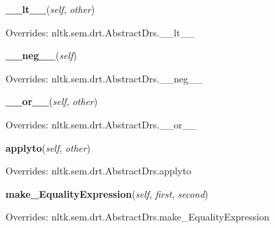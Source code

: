 \hspace{.8\funcindent}\begin{boxedminipage}{\funcwidth}

    \raggedright \textbf{\_\_lt\_\_}(\textit{self}, \textit{other})

\setlength{\parskip}{2ex}
\setlength{\parskip}{1ex}
      Overrides: nltk.sem.drt.AbstractDrs.\_\_lt\_\_

    \end{boxedminipage}

    \vspace{0.5ex}

\hspace{.8\funcindent}\begin{boxedminipage}{\funcwidth}

    \raggedright \textbf{\_\_neg\_\_}(\textit{self})

\setlength{\parskip}{2ex}
\setlength{\parskip}{1ex}
      Overrides: nltk.sem.drt.AbstractDrs.\_\_neg\_\_

    \end{boxedminipage}

    \vspace{0.5ex}

\hspace{.8\funcindent}\begin{boxedminipage}{\funcwidth}

    \raggedright \textbf{\_\_or\_\_}(\textit{self}, \textit{other})

\setlength{\parskip}{2ex}
\setlength{\parskip}{1ex}
      Overrides: nltk.sem.drt.AbstractDrs.\_\_or\_\_

    \end{boxedminipage}

    \vspace{0.5ex}

\hspace{.8\funcindent}\begin{boxedminipage}{\funcwidth}

    \raggedright \textbf{applyto}(\textit{self}, \textit{other})

\setlength{\parskip}{2ex}
\setlength{\parskip}{1ex}
      Overrides: nltk.sem.drt.AbstractDrs.applyto

    \end{boxedminipage}

    \vspace{0.5ex}

\hspace{.8\funcindent}\begin{boxedminipage}{\funcwidth}

    \raggedright \textbf{make\_EqualityExpression}(\textit{self}, \textit{first}, \textit{second})

\setlength{\parskip}{2ex}
\setlength{\parskip}{1ex}
      Overrides: nltk.sem.drt.AbstractDrs.make\_EqualityExpression

    \end{boxedminipage}

